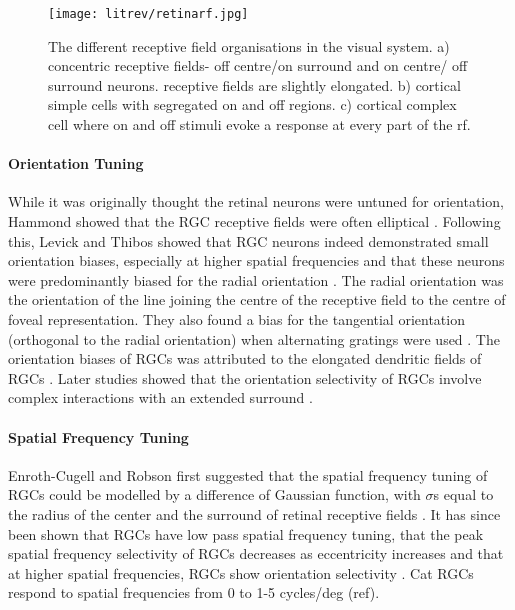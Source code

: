 \begin{figure}[H]
	
	\texttt{[image: litrev/retinarf.jpg]}
	\centering
	\caption{The different receptive field organisations in the visual system. a) concentric receptive fields- off centre/on surround and on centre/ off surround neurons. receptive fields are slightly elongated. b) cortical simple cells with segregated on and off regions. c) cortical complex cell where on and off stimuli evoke a response at every part of the rf.}
	
	\label{fig:rforg}
\end{figure}

\paragraph{Orientation Tuning}

While it was originally thought the retinal neurons were untuned for orientation, Hammond showed that the RGC receptive fields were often elliptical \cite{Hammond1974}. Following this, Levick and Thibos showed that RGC neurons indeed demonstrated small orientation biases, especially at higher spatial frequencies and that these neurons were predominantly biased for the radial orientation \cite{Levick1980, Levick1982c}. The radial orientation was the orientation of the line joining the centre of the receptive field to the centre of foveal representation. They also found a bias for the tangential orientation (orthogonal to the radial orientation) when alternating gratings were used \cite{Thibos1985}. The orientation biases of RGCs was attributed to the elongated dendritic fields of RGCs \cite{Leventhal1983a}. Later studies showed that the orientation selectivity of RGCs involve complex interactions with an extended surround \cite{Shou2000}.

\paragraph{Spatial Frequency Tuning}

Enroth-Cugell and Robson first suggested that the spatial frequency tuning of RGCs could be modelled by a difference of Gaussian function, with $\sigma$s equal to the radius of the center and the surround of retinal receptive fields \cite{Enroth-cugell1966b}. It has since been shown that RGCs have low pass spatial frequency tuning, that the peak spatial frequency selectivity of RGCs decreases as eccentricity increases and that at higher spatial frequencies, RGCs show orientation selectivity \cite{Levick1980, Levick1982c}. Cat RGCs respond to spatial frequencies from 0 to 1-5 cycles/deg (ref).

